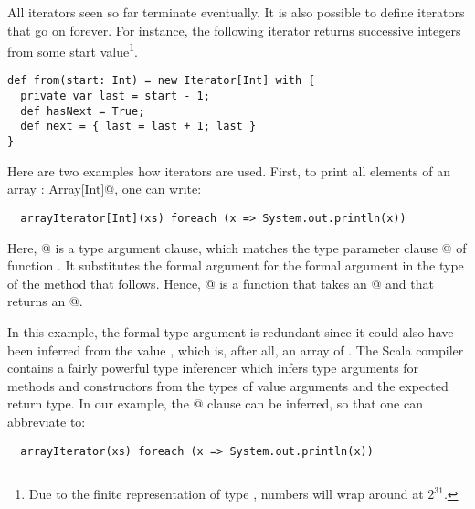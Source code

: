 \documentclass[11pt]{report}
\begin{document}
All iterators seen so far terminate eventually. It is also possible to
define iterators that go on forever. For instance, the following
iterator returns successive integers from some start
value\footnote{Due to the finite representation of type ,
numbers will wrap around at $2^31$.}.
\begin{verbatim}
def from(start: Int) = new Iterator[Int] with {
  private var last = start - 1;
  def hasNext = True;
  def next = { last = last + 1; last }
}
\end{verbatim}
Here are two examples how iterators are used. First, to print all
elements of an array \verb@xs: Array[Int]@, one can write:
\begin{verbatim}
  arrayIterator[Int](xs) foreach (x => System.out.println(x))
\end{verbatim}
Here, \verb@[Int]@ is a type argument clause, which matches the type
parameter clause \verb@[a]@ of function \verb@arrayIterator@. It
substitutes the formal argument \verb@Int@ for the formal argument
\verb@a@ in the type of the method that follows. Hence,
\verb@arrayIterator[a]@ is a function that takes an \verb@Array[Int]@
and that returns an \verb@Iterator[Int]@.

In this example, the formal type argument \verb@Int@ is redundant
since it could also have been inferred from the value \verb@xs@, which
is, after all, an array of \verb@Int@. The Scala compiler contains a
fairly powerful type inferencer which infers type arguments for
methods and constructors from the types of value arguments and the
expected return type. In our example, the \verb@[Int]@ clause can be
inferred, so that one can abbreviate to:
\begin{verbatim}
  arrayIterator(xs) foreach (x => System.out.println(x))
\end{verbatim}
\end{document}
